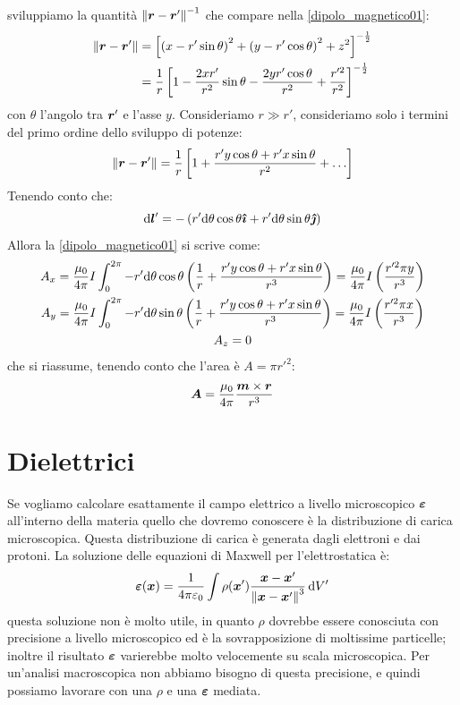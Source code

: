 sviluppiamo la quantità $\left\lVert\boldsymbol{r}-\boldsymbol{r}'\right\rVert^{-1}$ che compare nella \eqref{dipolo_magnetico01}:
\begin{equation*}
\begin{split}
\left\lVert\boldsymbol{r}-\boldsymbol{r}'\right\rVert&=\left[\left(x-r'\sin\theta\right)^2+\left(y-r'\cos\theta\right)^2+z^2\right]^{-\frac{1}{2}}\\
&=\frac{1}{r}\left[1-\frac{2xr'}{r^2}\sin\theta-\frac{2yr'\cos\theta}{r^2}+\frac{r'^2}{r^2}\right]^{-\frac{1}{2}}
\end{split}
\end{equation*}
con $\theta$ l'angolo tra $\boldsymbol{r}'$ e l'asse $y$. Consideriamo $r\gg r'$, consideriamo solo i termini del primo ordine dello sviluppo di potenze:
\begin{equation}
\left\lVert\boldsymbol{r}-\boldsymbol{r}'\right\rVert=\frac{1}{r}\left[1+\frac{r' y\cos\theta+r' x\sin\theta}{r^2}+\ldots\right]
\end{equation}
Tenendo conto che:
\begin{equation}
\mathrm{d} \boldsymbol{l}'=-\left(r'\mathrm{d}\theta\cos\theta\boldsymbol{\hat {\imath}}+r'\mathrm{d}\theta\sin\theta\boldsymbol{\hat {\jmath}}\right)
\end{equation}
Allora la \eqref{dipolo_magnetico01} si scrive come:
\begin{subequations}
\begin{gather}
A_x=\frac{\mu_0}{4\pi}I\int_0^{2\pi}-r'\mathrm{d}\theta\cos\theta\left(\frac{1}{r}+\frac{r'y\cos\theta+r'x\sin\theta}{r^3}\right)=\frac{\mu_0}{4\pi}I\left(\frac{r'^2\pi y}{r^3}\right)\\
A_y=\frac{\mu_0}{4\pi}I\int_0^{2\pi}-r'\mathrm{d}\theta\sin\theta\left(\frac{1}{r}+\frac{r'y\cos\theta+r'x\sin\theta}{r^3}\right)=\frac{\mu_0}{4\pi}I\left(\frac{r'^2\pi x}{r^3}\right)\\
A_z=0
\end{gather}
\end{subequations}
che si riassume, tenendo conto che l'area è $A=\pi r'^2$:
\begin{equation}
\boldsymbol{A}=\frac{\mu_0}{4\pi}\frac{\boldsymbol{m}\times\boldsymbol{r}}{r^3}
\end{equation}


\chapter{Dielettrici}
\minitoc
Se vogliamo calcolare esattamente il campo elettrico a livello microscopico $\boldsymbol{\varepsilon}$ all'interno della materia quello che dovremo conoscere è la distribuzione di carica microscopica. Questa distribuzione di carica è generata dagli elettroni e dai protoni. La soluzione delle equazioni di Maxwell per l'elettrostatica è:
\begin{equation}
 \boldsymbol{\varepsilon}(\boldsymbol{x}) = \frac{1}{4\pi\varepsilon_0}\int \rho(\boldsymbol{x}')\frac{\boldsymbol{x} -\boldsymbol{x}'}{\left\lVert\boldsymbol{x}-\boldsymbol{x}'\right\rVert^3}\,\mathrm{d} V'
\end{equation}
questa soluzione non è molto utile, in quanto $\rho$ dovrebbe essere conosciuta con precisione a livello microscopico ed è la sovrapposizione di moltissime particelle; inoltre il risultato $\boldsymbol{\varepsilon}$ varierebbe molto velocemente su scala microscopica. Per un'analisi macroscopica non abbiamo bisogno di questa precisione, e quindi possiamo lavorare con una $\rho$ e una $\boldsymbol{\varepsilon}$ mediata.

